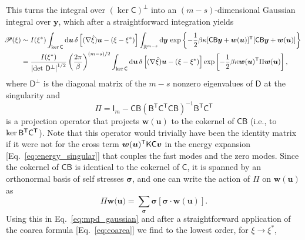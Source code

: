 This turns the integral over $(\ker\mathsf{C})^{\perp}$ into an $(m-s)$-dimensional Gaussian integral over $\bm{y}$, which after a straightforward integration yields
%
\begin{equation}
  \hspace{-0.5em}
  \begin{aligned}
    \mathscr{P}(\xi) &\sim I(\xi^{*}) \int_{\ker\mathsf{C}} \mathrm{d}\bm{u}\, \delta\left[(\nabla\hat{\xi})\bm{u} - (\xi - \xi^{*})\right] \int_{\mathbb{R}^{m-s}} \mathrm{d}\bm{y}\, \exp\left\{-\frac{1}{2}\beta\kappa[\mathsf{C}\mathsf{B}\bm{y} + \bm{w}(\bm{u})]^\mathsf{T}[\mathsf{C}\mathsf{B}\bm{y} + \bm{w}(\bm{u})]\right\}\\
                                             &= \frac{I(\xi^{*})}{\left|\det\, \mathsf{D}^\perp\right|^{1/2}} \left(\frac{2\pi}{\beta}\right)^{(m-s)/2} \int_{\ker\mathsf{C}} \mathrm{d}\bm{u}\, \delta\left[(\nabla\hat{\xi})\bm{u} - (\xi - \xi^{*})\right] \exp\left[-\frac{1}{2}\beta\kappa \bm{w}(\bm{u})^\mathsf{T}\Pi \bm{w}(\bm{u})\right],
  \end{aligned}
  \label{eq:mpd_gaussian}
\end{equation}
%
where $\mathsf{D}^\perp$ is the diagonal matrix of the $m - s$ nonzero eigenvalues of $\mathsf{D}$ at the singularity and
%
\begin{equation}
  \Pi = \mathsf{I}_{m} - \mathsf{C}\mathsf{B} (\mathsf{B} ^\mathsf{T}\mathsf{C}^\mathsf{T}\mathsf{C}\mathsf{B} )^{-1}\mathsf{B} ^\mathsf{T}\mathsf{C}^\mathsf{T}
\end{equation}
%
is a projection operator that projects $\bm{w}(\bm{u})$ to the cokernel of $\mathsf{C}\mathsf{B}$ (i.e., to $\ker\mathsf{B}^\mathsf{T}\mathsf{C}^\mathsf{T}$).
Note that this operator would trivially have been the identity matrix if it were not for the cross term $\bm{w}(\bm{u})^\mathsf{T}\mathsf{K}\mathsf{C}\bm{v}$ in the energy expansion [Eq.~\eqref{eq:energy_singular}] that couples the fast modes and the zero modes.
Since the cokernel of $\mathsf{CB}$ is identical to the cokernel of $\mathsf{C}$, it is spanned by an orthonormal basis of self stresses $\bm{\sigma}$, and one can write the action of $\Pi$ on $\bm{w}(\bm{u})$ as
%
\begin{equation}
  \Pi \bm{w}(\bm{u)} = \sum_{\bm{\sigma}} \bm{\sigma}[\bm{\sigma}\cdot\bm{w}(\bm{u})].
  \label{eq:mpd_proj}
\end{equation}
%
Using this in Eq.~\eqref{eq:mpd_gaussian} and after a straightforward application of the coarea formula [Eq.~\eqref{eq:coarea}] we find to the lowest order, for $\xi \to \xi^{*}$,
%
